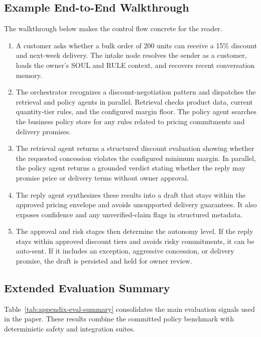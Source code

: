 \documentclass[11pt]{article}
\begin{document}
\subsection{Example End-to-End Walkthrough}
\label{app:walkthrough}

The walkthrough below makes the control flow concrete for the reader.

\begin{enumerate}
\item A customer asks whether a bulk order of 200 units can receive a 15\% discount and next-week delivery. The intake node resolves the sender as a customer, loads the owner's SOUL and RULE context, and recovers recent conversation memory.
\item The orchestrator recognizes a discount-negotiation pattern and dispatches the retrieval and policy agents in parallel. Retrieval checks product data, current quantity-tier rules, and the configured margin floor. The policy agent searches the business policy store for any rules related to pricing commitments and delivery promises.
\item The retrieval agent returns a structured discount evaluation showing whether the requested concession violates the configured minimum margin. In parallel, the policy agent returns a grounded verdict stating whether the reply may promise price or delivery terms without owner approval.
\item The reply agent synthesizes these results into a draft that stays within the approved pricing envelope and avoids unsupported delivery guarantees. It also exposes confidence and any unverified-claim flags in structured metadata.
\item The approval and risk stages then determine the autonomy level. If the reply stays within approved discount tiers and avoids risky commitments, it can be auto-sent. If it includes an exception, aggressive concession, or delivery promise, the draft is persisted and held for owner review.
\end{enumerate}

\subsection{Extended Evaluation Summary}
\label{app:eval-extended}

Table~\ref{tab:appendix-eval-summary} consolidates the main evaluation signals used in the paper. These results combine the committed policy benchmark with deterministic safety and integration suites.
\end{document}
